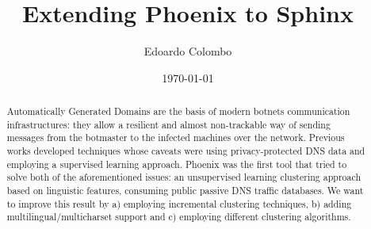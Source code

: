 \documentclass[10pt, journal, a4paper]{IEEEtran}
\author{Edoardo Colombo}
\title{Extending Phoenix to Sphinx}
\date{\today}
\begin{document}
\maketitle
\begin{abstract}
Automatically Generated Domains are the basis of modern botnets communication infrastructures:
they allow a resilient and almost non-trackable way of sending messages from the botmaster to the
infected machines over the network. Previous works developed techniques whose caveats were using
privacy-protected DNS data and employing a supervised learning approach. Phoenix \cite{Lorenzo2013}
was the first tool that tried to solve both of the aforementioned issues: an unsupervised learning
clustering approach based on linguistic features, consuming public passive DNS traffic databases.
We want to improve this result by a) employing incremental clustering techniques, b) adding multilingual/multicharset support and c) employing different clustering algorithms.
\end{abstract}

  
  
  
  



\end{document}
